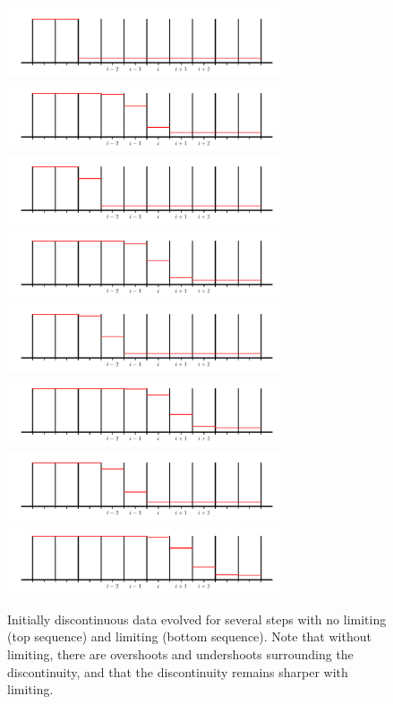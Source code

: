 \documentclass[11pt]{article}
\begin{document}
\begin{figure}[p!]
\vskip 0.5in
\includegraphics[width=3.25in]{rea-start_001}\hspace{1em}
\includegraphics[width=3.25in]{rea-start_005} \\
\includegraphics[width=3.25in]{rea-start_002}\hspace{1em}
\includegraphics[width=3.25in]{rea-start_006} \\
\includegraphics[width=3.25in]{rea-start_003}\hspace{1em}
\includegraphics[width=3.25in]{rea-start_007} \\
\includegraphics[width=3.25in]{rea-start_004}\hspace{1em}
\includegraphics[width=3.25in]{rea-start_008} \\
\caption{\label{fig:limitingex}Initially discontinuous data evolved for several steps with
  no limiting (top sequence) and limiting (bottom sequence).  Note
  that without limiting, there are overshoots and undershoots
  surrounding the discontinuity, and that the discontinuity remains
  sharper with limiting.}
\clearpage
\end{figure}
\end{document}
